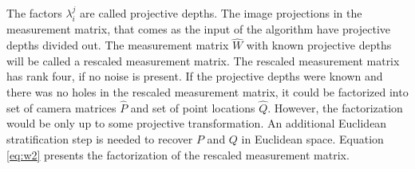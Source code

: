 \documentclass[12pt]{article}
\begin{document}

The factors $\lambda_i^j$ are called projective depths. The image projections in
the measurement matrix, that comes as the input of the algorithm have projective
depths divided out. The measurement matrix $\hat{W}$ with known projective
depths will be called a rescaled measurement matrix. The rescaled measurement
matrix has rank four, if no noise is present. If the projective depths were
known and there was no holes in the rescaled measurement matrix, it could be
factorized into set of camera matrices $\hat{P}$ and set of point locations
$\hat{Q}$.  However, the factorization would be only up to some projective
transformation. An additional  Euclidean stratification step is needed to
recover $P$ and $Q$ in Euclidean space. Equation  \ref{eq:w2} presents the
factorization of the rescaled measurement matrix.
\end{document}
